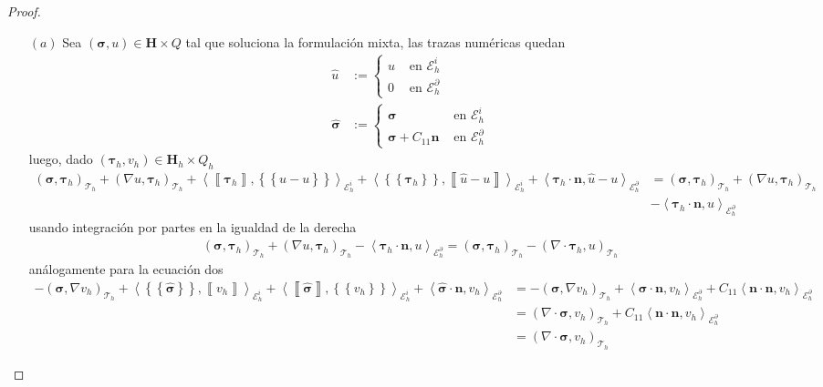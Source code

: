 \documentclass[10pt,a4paper]{report}
\newcommand{\bs}{\boldsymbol}
\newcommand{\Th}{\mathscr{T}_{h}}
\providecommand{\E}[1]{\mathscr{E}^{#1}_{h}}
\providecommand{\salto}[1]{\left\llbracket#1\right\rrbracket}
\providecommand{\prom}[1]{\left \{\!\left \{#1\right \}\!\right \}}
\providecommand{\PI}[2]{\left\langle #1,#2  \right\rangle}
\providecommand{\Pii}[2]{\left( #1,#2  \right)}
\begin{document}
    \begin{proof}
    	\begin{itemize}
    		\item[$(a)$] Sea $(\bs{\sigma},u)\in \bs{H}\times Q$ tal que soluciona la formulación mixta, las trazas numéricas quedan
    		\begin{align*}
    			\hat{u} &:= \begin{cases}
    				u & \text{ en } \E{i} \\ 
    				0 & \text{ en } \E{\partial}
    			\end{cases} \\
    			\hat{\bs{\sigma}} &:= \begin{cases}
    				\bs{\sigma} & \text{ en } \E{i} \\ 
    				\bs{\sigma} + C_{11}\textbf{n} & \text{ en } \E{\partial}
    			\end{cases}
    		\end{align*}
    	   luego, dado $\Pii{\bs{\tau}_{h}}{v_{h}}\in \textbf{H}_{h}\times Q_{h}$
    	   \begin{align*}
    	   	\Pii{\bs{\sigma}}{\bs{\tau}_{h}}_{\Th} + \Pii{\nabla u}{\bs{\tau}_{h}}_{\Th} + \PI{\salto{\bs{\tau}_{h}}}{\prom{\hat{u}-u}}_{\E{i}} + \PI{\prom{\bs{\tau}_{h}}}{\salto{\hat{u}-u}}_{\E{i}} + \PI{\bs{\tau}_{h}\cdot \textbf{n}}{\hat{u}-u}_{\E{\partial}} &= \Pii{\bs{\sigma}}{\bs{\tau}_{h}}_{\Th} + \Pii{\nabla u}{\bs{\tau}_{h}}_{\Th}\\ &-  \PI{\bs{\tau}_{h}\cdot \textbf{n}}{u}_{\E{\partial}}
    	   \end{align*}
           usando integración por partes en la igualdad de la derecha
           \begin{align*}
           	\Pii{\bs{\sigma}}{\bs{\tau}_{h}}_{\Th} + \Pii{\nabla u}{\bs{\tau}_{h}}_{\Th} -  \PI{\bs{\tau}_{h}\cdot \textbf{n}}{u}_{\E{\partial}} = \Pii{\bs{\sigma}}{\bs{\tau}_{h}}_{\Th} - \Pii{\nabla\cdot \bs{\tau}_{h}}{u}_{\Th}
           \end{align*}
           análogamente para la ecuación dos
           \begin{align*}
           	-\Pii{\bs{\sigma}}{\nabla v_{h}}_{\Th} + \PI{\prom{\hat{\bs{\sigma}}}}{\salto{v_{h}}}_{\E{i}} + \PI{\salto{\hat{\bs{\sigma}}}}{\prom{v_{h}}}_{\E{i}} + \PI{\hat{\bs{\sigma}}\cdot \textbf{n}}{v_{h}}_{\E{\partial}} &= -\Pii{\bs{\sigma}}{\nabla v_{h}}_{\Th} +  \PI{\bs{\sigma}\cdot \textbf{n}}{v_{h}}_{\E{\partial}} + C_{11}\PI{\textbf{n}\cdot \textbf{n}}{v_{h}}_{\E{\partial}}\\
           	&= \Pii{\nabla\cdot\bs{\sigma}}{ v_{h}}_{\Th} +  C_{11}\PI{\textbf{n}\cdot \textbf{n}}{v_{h}}_{\E{\partial}}\\ &= \Pii{\nabla\cdot\bs{\sigma}}{ v_{h}}_{\Th}

\end{align*}
\end{itemize}
\end{proof}
\end{document}
